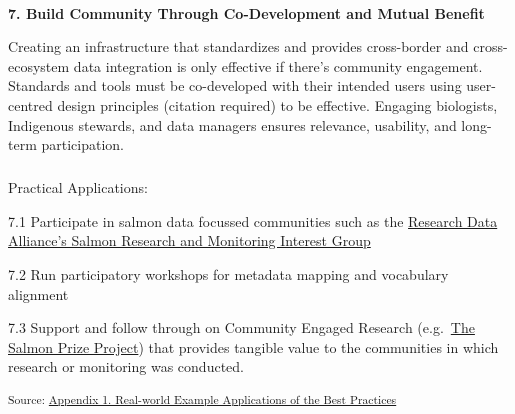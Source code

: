 \documentclass[
  letterpaper,
  DIV=11,
  numbers=noendperiod]{scrartcl}
\makeatletter
\let\oldparagraph\paragraph
\renewcommand{\paragraph}{
    \@ifstar
      \xxxParagraphStar
      \xxxParagraphNoStar
  }
\newcommand{\xxxParagraphStar}[1]{\oldparagraph*{#1}\mbox{}}
\newcommand{\xxxParagraphNoStar}[1]{\oldparagraph{#1}\mbox{}}
\let\oldsubparagraph\subparagraph
\renewcommand{\subparagraph}{
    \@ifstar
      \xxxSubParagraphStar
      \xxxSubParagraphNoStar
  }
\newcommand{\xxxSubParagraphStar}[1]{\oldsubparagraph*{#1}\mbox{}}
\newcommand{\xxxSubParagraphNoStar}[1]{\oldsubparagraph{#1}\mbox{}}
\makeatother
\begin{document}
\paragraph{\texorpdfstring{\textbf{7. Build Community Through
Co-Development and Mutual
Benefit}}{7. Build Community Through Co-Development and Mutual Benefit}}\label{build-community-through-co-development-and-mutual-benefit}

Creating an infrastructure that standardizes and provides cross-border
and cross-ecosystem data integration is only effective if there's
community engagement. Standards and tools must be co-developed with
their intended users using user-centred design principles (citation
required) to be effective. Engaging biologists, Indigenous stewards, and
data managers ensures relevance, usability, and long-term participation.

\subparagraph{Practical Applications:}\label{practical-applications-6}

7.1 Participate in salmon data focussed communities such as the
\href{https://www.rd-alliance.org/groups/salmon-research-and-monitoring-ig/}{Research
Data Alliance's Salmon Research and Monitoring Interest Group}~

7.2 Run participatory workshops for metadata mapping and vocabulary
alignment

7.3 Support and follow through on Community Engaged Research
(e.g.~\href{https://salmonprize.com}{The Salmon Prize Project}) that
provides tangible value to the communities in which research or
monitoring was conducted.

\textsubscript{Source:
\href{https://br-johnson.github.io/sdm-paper/appendices/appendix-1-real-world-examples-preview.html\#60714cfd-7208-4f0b-bbbf-00e0e81da17b}{Appendix
1. Real-world Example Applications of the Best Practices}}
\end{document}
